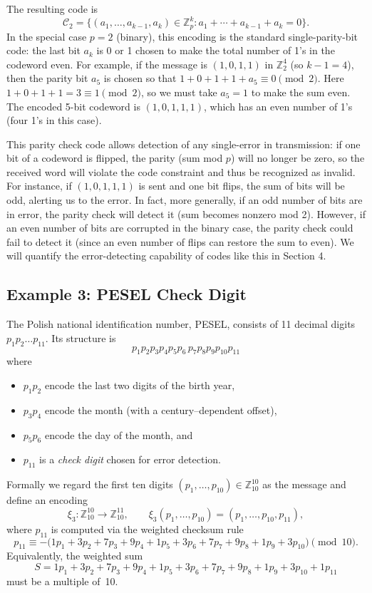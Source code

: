 \documentclass[docmute]{article}
\begin{document}
The resulting code is 
\[ \mathcal{C}_2 = \{(a_1,\ldots,a_{k-1},a_k) \in \mathbb{Z}_p^k : a_1 + \cdots + a_{k-1} + a_k = 0\}. \] 
In the special case $p=2$ (binary), this encoding is the standard single-parity-bit code: the last bit $a_k$ is 0 or 1 chosen to make the total number of 1's in the codeword even. For example, if the message is $(1,0,1,1)$ in $\mathbb{Z}_2^4$ (so $k-1=4$), then the parity bit $a_5$ is chosen so that $1+0+1+1+a_5 \equiv 0 \pmod{2}$. Here $1+0+1+1 = 3 \equiv 1 \pmod{2}$, so we must take $a_5 = 1$ to make the sum even. The encoded 5-bit codeword is $(1,0,1,1,1)$, which has an even number of 1's (four 1's in this case).

This parity check code allows detection of any single-error in transmission: if one bit of a codeword is flipped, the parity (sum mod $p$) will no longer be zero, so the received word will violate the code constraint and thus be recognized as invalid. For instance, if $(1,0,1,1,1)$ is sent and one bit flips, the sum of bits will be odd, alerting us to the error. In fact, more generally, if an odd number of bits are in error, the parity check will detect it (sum becomes nonzero mod 2). However, if an even number of bits are corrupted in the binary case, the parity check could fail to detect it (since an even number of flips can restore the sum to even). We will quantify the error-detecting capability of codes like this in Section 4.

\subsection*{Example 3: \textsc{PESEL} Check Digit}
The Polish national identification number, \textsc{PESEL}, consists of 11 decimal digits $p_1p_2\dots p_{11}$.  Its structure is
\[
  p_1p_2p_3p_4p_5p_6\,p_7p_8p_9p_{10}p_{11}
\]
where
\begin{itemize}
  \item $p_1p_2$ encode the last two digits of the birth year,
  \item $p_3p_4$ encode the month (with a century--dependent offset),
  \item $p_5p_6$ encode the day of the month, and
  \item $p_{11}$ is a \emph{check digit} chosen for error detection.
\end{itemize}

Formally we regard the first ten digits $(p_1,\dots,p_{10})\in\mathbb{Z}_{10}^{10}$ as the message and define an encoding
\[
  \xi_3: \mathbb{Z}_{10}^{10}\longrightarrow\mathbb{Z}_{10}^{11},\qquad \xi_3(p_1,\dots,p_{10})=(p_1,\dots,p_{10},p_{11}),
\]
where $p_{11}$ is computed via the weighted checksum rule
\[
  p_{11}\equiv -\bigl(1p_1+3p_2+7p_3+9p_4+1p_5+3p_6+7p_7+9p_8+1p_9+3p_{10}\bigr)\pmod{10}.
\]
Equivalently, the weighted sum
\[
   S=1p_1+3p_2+7p_3+9p_4+1p_5+3p_6+7p_7+9p_8+1p_9+3p_{10}+1p_{11}
\]
must be a multiple of~10.
\end{document}
